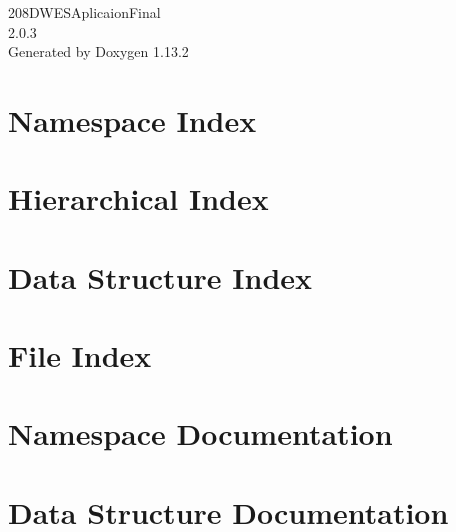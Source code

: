 \documentclass[twoside]{book}
\newcommand{\+}{\discretionary{\mbox{\scriptsize$\hookleftarrow$}}{}{}}
\newcommand{\clearemptydoublepage}{%
    \newpage{\pagestyle{empty}\cleardoublepage}%
  }
\begin{document}
  \raggedbottom
    \hypersetup{pageanchor=false,
                bookmarksnumbered=true,
                pdfencoding=unicode
               }
  \begin{titlepage}
  \vspace*{7cm}
  \begin{center}%
  {\Large 208\+DWESAplicaion\+Final}\\
  [1ex]\large 2.\+0.\+3 \\
  \vspace*{1cm}
  {\large Generated by Doxygen 1.13.2}\\
  \end{center}
  \end{titlepage}
  \clearemptydoublepage
  \tableofcontents
  \clearemptydoublepage
  \hypersetup{pageanchor=true}

\chapter{Namespace Index}

\chapter{Hierarchical Index}

\chapter{Data Structure Index}

\chapter{File Index}

\chapter{Namespace Documentation}

\chapter{Data Structure Documentation}












\end{document}
